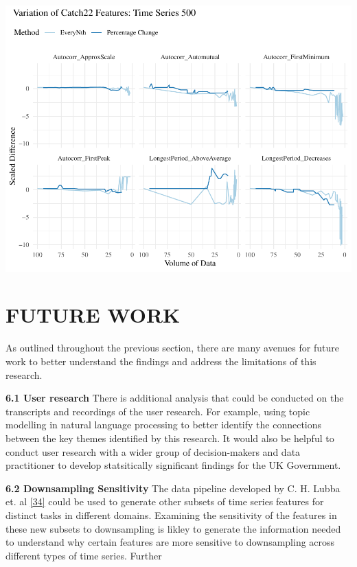 \documentclass{article}
\begin{document}
\includegraphics{210431461_CSC8639_Dissertation_files/figure-latex/Catch22Variation-1.pdf}

\hypertarget{future-work}{%
\section{FUTURE WORK}\label{future-work}}

\label{sec:headings}

As outlined throughout the previous section, there are many avenues for
future work to better understand the findings and address the
limitations of this research.

\textbf{6.1 User research} There is additional analysis that could be
conducted on the transcripts and recordings of the user research. For
example, using topic modelling in natural language processing to better
identify the connections between the key themes identified by this
research. It would also be helpful to conduct user research with a wider
group of decision-makers and data practitioner to develop statsitically
significant findings for the UK Government.

\textbf{6.2 Downsampling Sensitivity} The data pipeline developed by C.
H. Lubba et. al \protect\hyperlink{ref-catch22}{{[}34{]}} could be used
to generate other subsets of time series features for distinct tasks in
different domains. Examining the sensitivity of the features in these
new subsets to downsampling is likley to generate the information needed
to understand why certain features are more sensitive to downsampling
across different types of time series. Further
\end{document}
